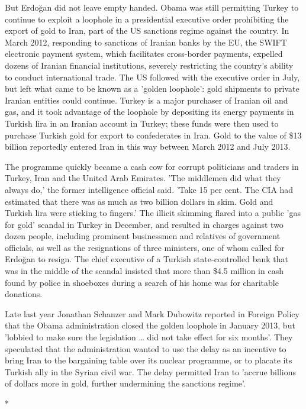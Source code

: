 But Erdo\u{g}an did not leave empty handed. Obama was still permitting
Turkey to continue to exploit a loophole in a presidential executive
order prohibiting the export of gold to Iran, part of the US sanctions
regime against the country. In March 2012, responding to sanctions
of Iranian banks by the EU, the SWIFT electronic payment system, which
facilitates cross-border payments, expelled dozens of Iranian financial
institutions, severely restricting the country's ability to conduct
international trade. The US followed with the executive order in July,
but left what came to be known as a 'golden loophole': gold shipments
to private Iranian entities could continue. Turkey is a major purchaser
of Iranian oil and gas, and it took advantage of the loophole by depositing
its energy payments in Turkish lira in an Iranian account in Turkey;
these funds were then used to purchase Turkish gold for export to
confederates in Iran. Gold to the value of \$13 billion reportedly
entered Iran in this way between March 2012 and July 2013.

The programme quickly became a cash cow for corrupt politicians and
traders in Turkey, Iran and the United Arab Emirates. 'The middlemen
did what they always do,' the former intelligence official said. 'Take
15 per cent. The CIA had estimated that there was as much as two billion
dollars in skim. Gold and Turkish lira were sticking to fingers.'
The illicit skimming flared into a public 'gas for gold' scandal in
Turkey in December, and resulted in charges against two dozen people,
including prominent businessmen and relatives of government officials,
as well as the resignations of three ministers, one of whom called
for Erdo\u{g}an to resign. The chief executive of a Turkish state-controlled
bank that was in the middle of the scandal insisted that more than
\$4.5 million in cash found by police in shoeboxes during a search
of his home was for charitable donations.

Late last year Jonathan Schanzer and Mark Dubowitz reported in Foreign
Policy that the Obama administration closed the golden loophole in
January 2013, but 'lobbied to make sure the legislation \ldots{} did
not take effect for six months'. They speculated that the administration
wanted to use the delay as an incentive to bring Iran to the bargaining
table over its nuclear programme, or to placate its Turkish ally in
the Syrian civil war. The delay permitted Iran to 'accrue billions
of dollars more in gold, further undermining the sanctions regime'.

{*}


